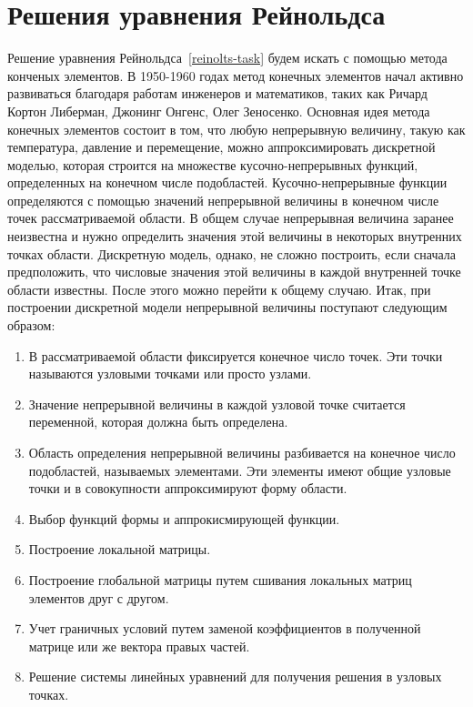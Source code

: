 \documentclass[a4paper,14pt]{extarticle}
\begin{document}
\section{Решения уравнения Рейнольдса}

Решение уравнения Рейнольдса~\eqref{reinolts-task} будем искать с помощью метода конченых элементов.
В 1950-1960 годах метод конечных элементов начал активно развиваться благодаря работам инженеров и математиков, таких как Ричард Кортон Либерман, Джонинг Онгенс, Олег Зеносенко.
Основная идея метода конечных элементов состоит в том, что любую непрерывную величину, такую как температура, давление и перемещение, можно аппроксимировать дискретной моделью, которая строится на множестве кусочно-непрерывных функций, определенных на конечном числе подобластей. Кусочно-непрерывные функции определяются с помощью значений непрерывной величины в конечном числе точек рассматриваемой области.
В общем случае непрерывная величина заранее неизвестна и нужно определить значения этой величины в некоторых внутренних точках области. Дискретную модель, однако, не сложно построить, если сначала предположить, что числовые значения этой величины в каждой внутренней точке области известны. После этого можно перейти к общему случаю. Итак, при построении дискретной модели непрерывной величины поступают следующим образом:
\begin{enumerate}
	\item В рассматриваемой области фиксируется конечное число точек. Эти точки называются узловыми точками или просто узлами.
	\item Значение непрерывной величины в каждой узловой точке считается переменной, которая должна быть определена.
	\item Область определения непрерывной величины разбивается на конечное число подобластей, называемых элементами. Эти элементы имеют общие узловые точки и в совокупности аппроксимируют форму области.
	\item Выбор функций формы и аппрокисмирующей функции.
	\item Построение локальной матрицы.
	\item Построение глобальной матрицы путем сшивания локальных матриц элементов друг с другом.
	\item Учет граничных условий путем заменой коэффициентов в полученной матрице или же вектора правых частей.
	\item Решение системы линейных уравнений для получения решения в узловых точках.
\end{enumerate}
\end{document}
